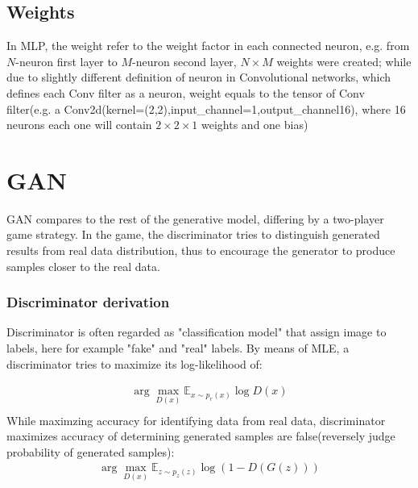 \documentclass{article}
\newcommand{\argmax}{\arg\!\max}
\begin{document}
\subsection*{Weights}
In MLP, the weight refer to the weight factor in each connected neuron, e.g. from $N$-neuron first layer to $M$-neuron second layer, $N\times M$ weights were created; while due to slightly different definition of neuron in Convolutional networks, which defines each Conv filter as a neuron, weight equals to the tensor of Conv filter(e.g. a Conv2d(kernel=(2,2),input\_channel=1,output\_channel16), where 16 neurons each one will contain $2\times 2\times 1$ weights and one bias)


\section{GAN}
GAN compares to the rest of the generative model, differing by a two-player game strategy. In the game, the discriminator tries to distinguish generated results from real data distribution, thus to encourage the generator to produce samples closer to the real data. \\

\subsubsection*{Discriminator derivation}
Discriminator is often regarded as "classification model" that assign image to labels, here for example "fake" and "real" labels. By means of MLE, a discriminator tries to maximize its log-likelihood of:

\begin{equation}
\begin{gathered}
\argmax_{D(x)} \mathbb{E}_{x\sim p_{r}(x)} \log{D(x)}\\
\end{gathered}
\end{equation}
While maximzing accuracy for identifying data from real data, discriminator maximizes accuracy of determining generated samples are false(reversely judge probability of generated samples):
\begin{equation}
    \begin{gathered}
\argmax_{D(x)} \mathbb{E}_{z\sim p_{z}(z)} \log{(1-D(G(z)))}\\
    \end{gathered}
\end{equation}
\end{document}
